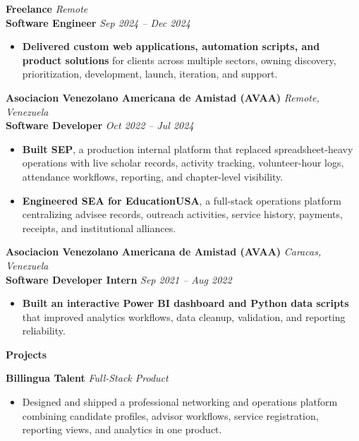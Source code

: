 \documentclass[11pt]{article}
\begin{document}
\vspace{8pt}
\textbf{Freelance} \hfill \textit{Remote} \\
\textbf{Software Engineer} \hfill \textit{Sep 2024 -- Dec 2024}
\begin{itemize}
    \item \textbf{Delivered custom web applications, automation scripts, and product solutions} for clients across multiple sectors, owning discovery, prioritization, development, launch, iteration, and support.
\end{itemize}

\vspace{8pt}
\textbf{Asociacion Venezolano Americana de Amistad (AVAA)} \hfill \textit{Remote, Venezuela} \\
\textbf{Software Developer} \hfill \textit{Oct 2022 -- Jul 2024}
\begin{itemize}
    \item \textbf{Built SEP}, a production internal platform that replaced spreadsheet-heavy operations with live scholar records, activity tracking, volunteer-hour logs, attendance workflows, reporting, and chapter-level visibility.
    \item \textbf{Engineered SEA for EducationUSA}, a full-stack operations platform centralizing advisee records, outreach activities, service history, payments, receipts, and institutional alliances.
\end{itemize}

\vspace{8pt}
\textbf{Asociacion Venezolano Americana de Amistad (AVAA)} \hfill \textit{Caracas, Venezuela} \\
\textbf{Software Developer Intern} \hfill \textit{Sep 2021 -- Aug 2022}
\begin{itemize}
    \item \textbf{Built an interactive Power BI dashboard and Python data scripts} that improved analytics workflows, data cleanup, validation, and reporting reliability.
\end{itemize}

\vspace{7pt}
\begin{center}
    \textbf{Projects}
\end{center}
\vspace{-4pt}

\textbf{Billingua Talent} \hfill \textit{Full-Stack Product}
\begin{itemize}
    \item Designed and shipped a professional networking and operations platform combining candidate profiles, advisor workflows, service registration, reporting views, and analytics in one product.
\end{itemize}
\end{document}
